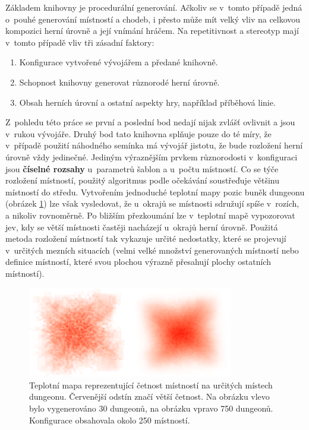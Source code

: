 Základem knihovny je procedurální generování.
Ačkoliv se v~tomto případě jedná o~pouhé generování místností a chodeb, i přesto může mít velký vliv na celkovou kompozici herní úrovně a její vnímání hráčem.
Na repetitivnost a stereotyp mají v~tomto případě vliv tři zásadní faktory:
\begin{enumerate}
    \item Konfigurace vytvořené vývojářem a předané knihovně.
    \item Schopnost knihovny generovat různorodé herní úrovně.
    \item Obsah herních úrovní a ostatní aspekty hry, například příběhová linie.
\end{enumerate}
Z~pohledu této práce se první a poslední bod nedají nijak zvlášť ovlivnit a jsou v~rukou vývojáře.
Druhý bod tato knihovna splňuje pouze do té míry, že v~případě použití náhodného semínka má vývojář jistotu, že bude rozložení herní úrovně vždy jedinečné.
Jediným výraznějším prvkem různorodosti v~konfiguraci jsou \textbf{číselné rozsahy} u~parametrů šablon a u~počtu místností.
Co se týče rozložení místností, použitý algoritmus podle očekávání soustřeďuje většinu místností do středu.
Vytvořením jednoduché teplotní mapy pozic buněk dungeonu (obrázek \ref{img:heatmap}) lze však vysledovat, že u~okrajů se místnosti sdružují spíše v~rozích, a nikoliv rovnoměrně.
Po bližším přezkoumání lze v~teplotní mapě vypozorovat jev, kdy se větší místnosti častěji nacházejí u~okrajů herní úrovně.
Použitá metoda rozložení místností tak vykazuje určité nedostatky, které se projevují v~určitých mezních situacích (velmi velké množství generovaných místností nebo definice místností, které svou plochou výrazně přesahují plochy ostatních místností).
\begin{figure}[ht]
    \centering
    \includegraphics[width=0.80\textwidth]{obrazky/heatmap.png}
    \caption{Teplotní mapa reprezentující četnost místností na určitých místech dungeonu. Červenější odstín značí větší četnost. Na obrázku vlevo bylo vygenerováno 30 dungeonů, na obrázku vpravo 750 dungeonů. Konfigurace obsahovala okolo 250 místností.}
    \label{img:heatmap}
\end{figure}

